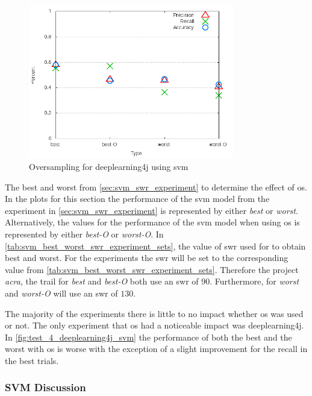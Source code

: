 \begin{figure}[!ht]
    \centering
        \includegraphics[width=0.8\textwidth]{images/svm/test_4/deeplearning4j_sample_range}
    \caption{Oversampling for deeplearning4j using \gls{svm}}
    \label{fig:test_4_deeplearning4j_svm}
\end{figure}

The best and worst from \autoref{sec:svm_swr_experiment} to determine the effect of \gls{os}. In the plots for this section the performance of the \gls{svm} model from the experiment in \autoref{sec:svm_swr_experiment} is represented by either \textit{best} or \textit{worst}. Alternatively, the values for the performance of the \gls{svm} model when using \gls{os} is represented by either \textit{best-O} or \textit{worst-O}. In \autoref{tab:svm_best_worst_swr_experiment_sets}, the value of \gls{swr} used for to obtain best and worst. For the experiments the \gls{swr} will be set to the corresponding value from \autoref{tab:svm_best_worst_swr_experiment_sets}. Therefore the project \textit{acra}, the trail for \textit{best} and \textit{best-O} both use an \gls{swr} of $90$. Furthermore, for \textit{worst} and \textit{worst-O} will use an \gls{swr} of $130$.

The majority of the experiments there is little to no impact whether \gls{os} was used or not. The only experiment that \gls{os} had a noticeable impact was deeplearning4j. In \autoref{fig:test_4_deeplearning4j_svm} the performance of both the best and the worst with \gls{os} is worse with the exception of a slight improvement for the recall in the best trials.

\subsubsection{SVM Discussion}
\label{subsec:svm_discussion}

